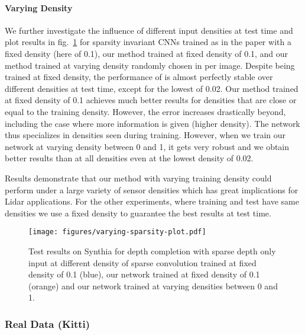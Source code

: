 \documentclass[10pt,twocolumn,letterpaper]{article}
\begin{document}
\paragraph{Varying Density}\label{sec:varyingDensitySynthia}
We further investigate the influence of different input densities at test time and plot results in fig.~\ref{fig:varyingSparsityPlot} for sparsity invariant CNNs \cite{uhrig2017sparsity} trained as in the paper with a fixed density (here of 0.1), our method trained at fixed density of 0.1, and our method trained at varying density randomly chosen in  per image. Despite being trained at fixed density, the performance of \cite{uhrig2017sparsity} is almost perfectly stable over different densities at test time, except for the lowest of 0.02.
Our method trained at fixed density of 0.1 achieves much better results for densities  that are close or equal to the training density. However, the error increases drastically beyond, including the case where more information is given (higher density). The network thus specializes in densities seen during training.
However, when we train our network at varying density between 0 and 1, it gets very robust and we obtain better results than \cite{uhrig2017sparsity} at all densities even at the lowest density of 0.02.

Results demonstrate that our method with varying training density could perform under a large variety of sensor densities which has great implications for Lidar applications.
For the other experiments, where training and test have same densities we use a fixed density to guarantee the best results at test time.
\begin{figure}
	\centering
	\texttt{[image: figures/varying-sparsity-plot.pdf]}
	\caption{Test results on Synthia for depth completion with sparse depth only input at different density of sparse convolution \cite{uhrig2017sparsity} trained at fixed density of 0.1 (blue), our network trained at fixed density of 0.1 (orange) and our network trained at varying densities between 0 and 1.}
	\label{fig:varyingSparsityPlot}
\end{figure}

\subsubsection{Real Data (Kitti)}
\label{sec:depthCompletionReal}
\end{document}
